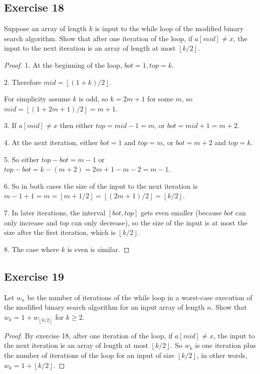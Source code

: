 \documentclass[14pt]{extarticle}
\newcommand{\floor}[1]{{\left\lfloor#1\right\rfloor}}
\begin{document}
\subsection{Exercise 18}
Suppose an array of length \(k\) is input to the while loop of the modified binary search algorithm. Show that after one 
iteration of the loop, if \(a[mid] \neq x\), the input to the next iteration is an array of length at most \(\floor{k/2}\).

\begin{proof}
1. At the beginning of the loop, \(bot = 1, top = k\). 

2. Therefore \(mid = \floor{(1+k)/2}\). 

For simplicity assume \(k\) is odd, so \(k = 2m+1\) for some \(m\), so \(mid = \floor{(1+2m+1)/2} = m+1\).

3. If \(a[mid] \neq x\) then either \(top = mid - 1 = m\), or \(bot = mid + 1 = m+2\).

4. At the next iteration, either \(bot = 1\) and \(top = m\), or \(bot = m+2\) and \(top = k\).

5. So either \(top - bot = m - 1\) or \(top - bot = k - (m+2) = 2m+1 - m - 2 = m-1\). 

6. So in both cases the size of the input to the next iteration is \(m-1+1 = m = \floor{m + 1/2} = \floor{(2m+1)/2}
= \floor{k/2}\).

7. In later iterations, the interval \([bot, top]\) gets even smaller (because \(bot\) can only increase and \(top\) can 
only decrease), so the size of the input is at most the size after the first iteration, which is \(\floor{k/2}\).

8. The case where \(k\) is even is similar.
\end{proof}

\subsection{Exercise 19}
Let \(w_n\) be the number of iterations of the while loop in a worst-case execution of the modified binary search algorithm 
for an input array of length \(n\). Show that \(w_k = 1 + w_{\floor{k/2}}\) for \(k \geq 2\).

\begin{proof}
By exercise 18, after one iteration of the loop, if \(a[mid] \neq x\), the input to the next iteration is an array of 
length at most \(\floor{k/2}\). So \(w_k\) is one iteration plus the number of iterations of the loop for an input of size
\(\floor{k/2}\), in other words, \(w_k = 1 + \floor{k/2}\).
\end{proof}
\end{document}
